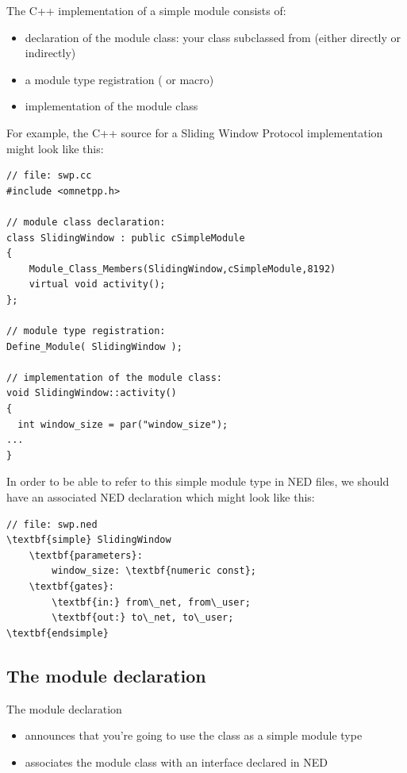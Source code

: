 The C++ implementation of a simple module consists of:
\begin{itemize}
\item{declaration of the module class: your class subclassed from  
(either directly or indirectly)}
\item{a module type registration ( or
     macro)}
\item{implementation of the module class}
\end{itemize}


For example, the C++ source for a Sliding Window Protocol implementation 
might look like this:

\begin{Verbatim}
// file: swp.cc
#include <omnetpp.h>

// module class declaration:
class SlidingWindow : public cSimpleModule
{
    Module_Class_Members(SlidingWindow,cSimpleModule,8192)
    virtual void activity();
};

// module type registration:
Define_Module( SlidingWindow );

// implementation of the module class:
void SlidingWindow::activity()
{
  int window_size = par("window_size");
...
}
\end{Verbatim}

In order to be able to refer to this simple module type in NED 
files, we should have an associated NED declaration which might 
look like this:


\begin{Verbatim}[commandchars=\\\{\}]
// file: swp.ned
\textbf{simple} SlidingWindow 
    \textbf{parameters}: 
        window_size: \textbf{numeric const}; 
    \textbf{gates}: 
        \textbf{in:} from\_net, from\_user; 
        \textbf{out:} to\_net, to\_user;
\textbf{endsimple}
\end{Verbatim}
  





\subsection{The module declaration}

The module declaration
\begin{itemize}
\item{announces that you're going to use the class as a
    simple module type}
\item{associates the module class with an interface declared in NED}
\end{itemize}

